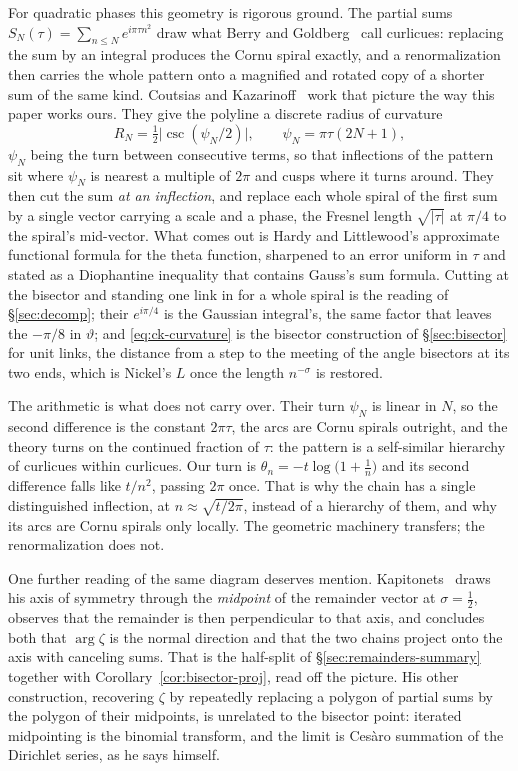 \documentclass[11pt]{article}
\theoremstyle{definition}
\begin{document}
For quadratic phases this geometry is rigorous ground. The partial sums
$S_N(\tau)=\sum_{n\le N}e^{i\pi\tau n^{2}}$ draw what Berry and
Goldberg~\cite{BerryGoldberg1988} call curlicues: replacing the sum by an
integral produces the Cornu spiral exactly, and a renormalization then carries
the whole pattern onto a magnified and rotated copy of a shorter sum of the same
kind. Coutsias and Kazarinoff~\cite{CoutsiasKazarinoff1987,CoutsiasKazarinoff1998}
work that picture the way this paper works ours. They give the polyline a
discrete radius of curvature
\begin{equation}\label{eq:ck-curvature}
R_N=\tfrac12\bigl|\csc(\psi_N/2)\bigr|,
\qquad \psi_N=\pi\tau(2N+1),
\end{equation}
$\psi_N$ being the turn between consecutive terms, so that inflections of the
pattern sit where $\psi_N$ is nearest a multiple of $2\pi$ and cusps where it
turns around. They then cut the sum \emph{at an inflection}, and replace each
whole spiral of the first sum by a single vector carrying a scale and a phase,
the Fresnel length $\sqrt{|\tau|}$ at $\pi/4$ to the spiral's mid-vector. What
comes out is Hardy and Littlewood's approximate functional formula for the theta
function, sharpened to an error uniform in $\tau$ and stated as a Diophantine
inequality that contains Gauss's sum formula. Cutting at the bisector and standing
one link in for a whole spiral is the reading of \S\ref{sec:decomp}; their
$e^{i\pi/4}$ is the Gaussian integral's, the same factor that leaves the
$-\pi/8$ in $\vartheta$; and \eqref{eq:ck-curvature} is the bisector construction of
\S\ref{sec:bisector} for unit links, the distance from a step to the meeting of
the angle bisectors at its two ends, which is Nickel's $L$ once the length
$n^{-\sigma}$ is restored.

The arithmetic is what does not carry over. Their turn $\psi_N$ is linear in
$N$, so the second difference is the constant $2\pi\tau$, the arcs are Cornu
spirals outright, and the theory turns on the continued fraction of $\tau$:
the pattern is a self-similar hierarchy of curlicues within curlicues. Our turn
is $\theta_n=-t\log\bigl(1+\tfrac1n\bigr)$ and its second difference falls like
$t/n^{2}$, passing $2\pi$ once. That is why the chain has a single distinguished
inflection, at $n\approx\sqrt{t/2\pi}$, instead of a hierarchy of them, and why its
arcs are Cornu spirals only locally. The geometric machinery transfers; the
renormalization does not.

One further reading of the same diagram deserves mention.
Kapitonets~\cite{Kapitonets2019} draws his axis of symmetry through the
\emph{midpoint} of the remainder vector at $\sigma=\tfrac12$, observes that the
remainder is then perpendicular to that axis, and concludes both that
$\arg\zeta$ is the normal direction and that the two chains project onto the axis
with canceling sums. That is the half-split of
\S\ref{sec:remainders-summary} together with Corollary~\ref{cor:bisector-proj},
read off the picture. His other construction,
recovering $\zeta$ by repeatedly replacing a polygon of partial sums by the
polygon of their midpoints, is unrelated to the bisector point: iterated
midpointing is the binomial transform, and the limit is Ces\`aro summation of the
Dirichlet series, as he says himself.
\end{document}
